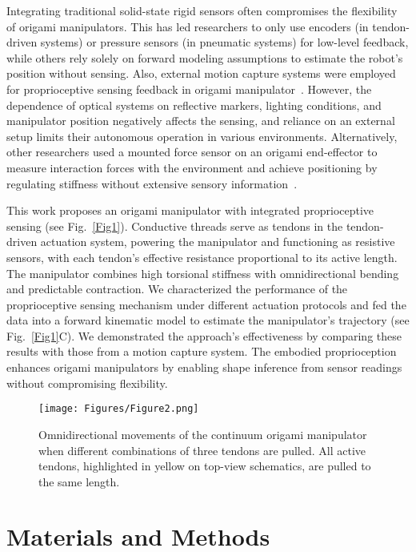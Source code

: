 \documentclass[journal, letterpaper]{IEEEtran}
\begin{document}
Integrating traditional solid-state rigid sensors often compromises the flexibility of origami manipulators. This has led researchers to only use encoders (in tendon-driven systems) or pressure sensors (in pneumatic systems) for low-level feedback, while others rely solely on forward modeling assumptions to estimate the robot's position without sensing. 
Also, external motion capture systems were employed for proprioceptive sensing feedback in origami manipulator~\cite{santoso2021origami}.
However, the dependence of optical systems on reflective markers, lighting conditions, and manipulator position negatively affects the sensing, and reliance on an external setup limits their autonomous operation in various environments.
Alternatively, other researchers used a mounted force sensor on an origami end-effector to measure interaction forces with the environment and achieve positioning by regulating stiffness without extensive sensory information~\cite{zhang2022design, zhang2023bioinspired}.

This work proposes an origami manipulator with integrated proprioceptive sensing (see Fig.~\ref{Fig1}). Conductive threads serve as tendons in the tendon-driven actuation system, powering the manipulator and functioning as resistive sensors, with each tendon's effective resistance proportional to its active length. The manipulator combines high torsional stiffness with omnidirectional bending and predictable contraction. We characterized the performance of the proprioceptive sensing mechanism under different actuation protocols and fed the data into a forward kinematic model to estimate the manipulator's trajectory (see Fig.~\ref{Fig1}C). We demonstrated the approach's effectiveness by comparing these results with those from a motion capture system. The embodied proprioception enhances origami manipulators by enabling shape inference from sensor readings without compromising flexibility.


\begin{figure*}[t]
\centering
\texttt{[image: Figures/Figure2.png]}
\caption{Omnidirectional movements of the continuum origami manipulator when different combinations of three tendons are pulled. All active tendons, highlighted in yellow on top-view schematics, are pulled to the same length. }
\label{Fig2}
\end{figure*}

\section{Materials and Methods}
\label{sec:background}
\end{document}
